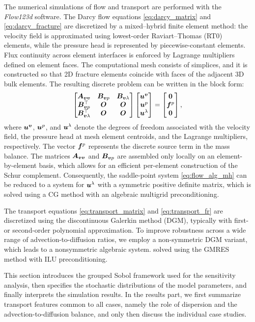 The numerical simulations of flow and transport are performed with the
\emph{Flow123d} software. The Darcy flow equations \eqref{eq:darcy_matrix} and
\eqref{eq:darcy_fracture} are discretized by a mixed--hybrid finite element
method: the velocity field is approximated using lowest-order Raviart--Thomas
(RT0) elements, while the pressure head is represented by piecewise-constant
 elements. Flux continuity across element interfaces is enforced by Lagrange
multipliers defined on element faces. The computational mesh consists of
simplices, and it is constructed so that 2D fracture elements coincide with
faces of the adjacent 3D bulk elements. The resulting discrete problem can be
written in the block form:
\begin{equation}
\label{eq:flow_alg_mh}
\begin{bmatrix}
\tn A_{\vc v\vc v} & \tn B_{\vc v p} & \tn B_{\vc v\lambda}\\
\tn B_{\vc v p}^\top & \tn O & \tn O\\
\tn B_{\vc v\lambda}^\top & \tn O & \tn O
\end{bmatrix}
%
\begin{bmatrix}
\uu^{\vc v}\\
\uu^p\\
\uu^\lambda
\end{bmatrix} =
%
\begin{bmatrix}
\vc 0\\
\vc f^p\\
\vc 0
\end{bmatrix},
\end{equation}
where ${\bm{u}}^{{\bm{v}}}$, ${\bm{u}}^p$, and ${\bm{u}}^\lambda$ denote the degrees of freedom
associated with the velocity field, the pressure head at mesh element
centroids, and the Lagrange multipliers, respectively. The vector ${\bm{f}}^p$
represents the discrete source term in the mass balance. The matrices
${\bm{A}}_{{\bm{v}}{\bm{v}}}$ and ${\bm{B}}_{{\bm{v}} p}$ are assembled only locally on an
element-by-element basis, which allows for an efficient per-element
construction of the Schur complement. Consequently, the saddle-point system
\eqref{eq:flow_alg_mh} can be reduced to a system for ${\bm{u}}^\lambda$ with a
symmetric positive definite matrix, which is solved using a CG method with an
algebraic multigrid preconditioning.

The transport equations \eqref{eq:transport_matrix} and \eqref{eq:transport_fr}
are discretized using the discontinuous Galerkin method (DGM), typically with
first- or second-order polynomial approximation. To improve robustness across a
wide range of advection-to-diffusion ratios, we employ a non-symmetric DGM
variant, which leads to a nonsymmetric algebraic system. solved using the GMRES
method with ILU preconditioning.

This section introduces the grouped Sobol framework used for the sensitivity
analysis, then specifies the stochastic distributions of the model parameters,
and finally interprets the simulation results. In the results part, we first
summarize transport features common to all cases, namely the role of dispersion
and the advection-to-diffusion balance, and only then discuss the individual
case studies.
